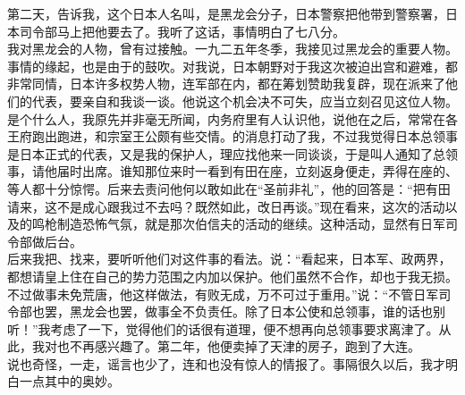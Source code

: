 第二天，告诉我，这个日本人名叫，是黑龙会分子，日本警察把他带到警察署，日本司令部马上把他要去了。我听了这话，事情明白了七八分。\\

我对黑龙会的人物，曾有过接触。一九二五年冬季，我接见过黑龙会的重要人物。事情的缘起，也是由于的鼓吹。对我说，日本朝野对于我这次被迫出宫和避难，都非常同情，日本许多权势人物，连军部在内，都在筹划赞助我复辟，现在派来了他们的代表，要亲自和我谈一谈。他说这个机会决不可失，应当立刻召见这位人物。是个什么人，我原先并非毫无所闻，内务府里有人认识他，说他在之后，常常在各王府跑出跑进，和宗室王公颇有些交情。的消息打动了我，不过我觉得日本总领事是日本正式的代表，又是我的保护人，理应找他来一同谈谈，于是叫人通知了总领事，请他届时出席。谁知那位来时一看到有田在座，立刻返身便走，弄得在座的、等人都十分惊愕。后来去责问他何以敢如此在“圣前非礼”，他的回答是：“把有田请来，这不是成心跟我过不去吗？既然如此，改日再谈。”现在看来，这次的活动以及的鸣枪制造恐怖气氛，就是那次伯信夫的活动的继续。这种活动，显然有日军司令部做后台。\\

后来我把、找来，要听听他们对这件事的看法。说：“看起来，日本军、政两界，都想请皇上住在自己的势力范围之内加以保护。他们虽然不合作，却也于我无损。不过做事未免荒唐，他这样做法，有败无成，万不可过于重用。”说：“不管日军司令部也罢，黑龙会也罢，做事全不负责任。除了日本公使和总领事，谁的话也别听！”我考虑了一下，觉得他们的话很有道理，便不想再向总领事要求离津了。从此，我对也不再感兴趣了。第二年，他便卖掉了天津的房子，跑到了大连。\\

说也奇怪，一走，谣言也少了，连和也没有惊人的情报了。事隔很久以后，我才明白一点其中的奥妙。\\

